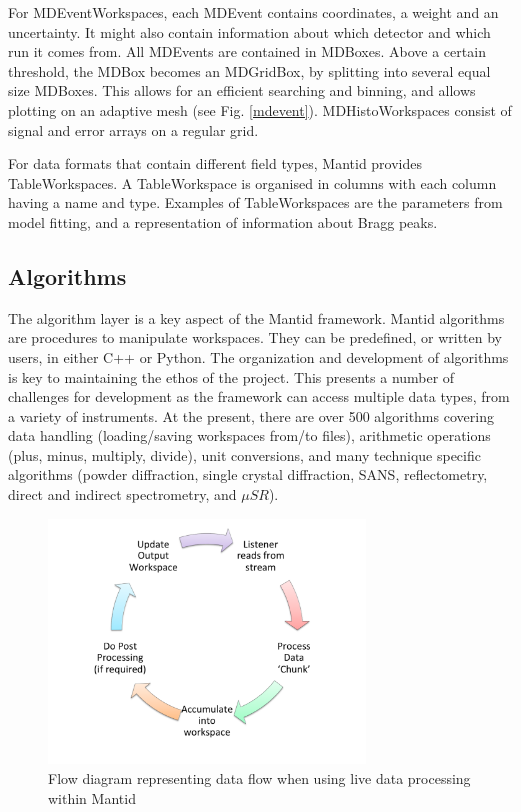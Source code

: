 \documentclass[1p]{elsarticle}
\begin{document}
For MDEventWorkspaces, each MDEvent contains coordinates, a weight and an uncertainty. It might also contain information about which detector and which run it comes from. All MDEvents are contained in MDBoxes. Above a certain threshold, the MDBox becomes an MDGridBox, by splitting into several equal size MDBoxes. This allows for an efficient searching and binning, and allows plotting on an adaptive mesh (see Fig. \ref{mdevent}).
MDHistoWorkspaces consist of signal and error arrays on a regular grid.  


For data formats that contain different field types, Mantid provides TableWorkspaces. A TableWorkspace is organised in columns with each column having a name and type. Examples of TableWorkspaces are the parameters from model fitting, and a representation of information about Bragg peaks.


\subsection{Algorithms}
The algorithm layer is a key aspect of the Mantid framework.
Mantid algorithms are procedures to manipulate workspaces. They can be predefined, or written by users, in either C++ or Python.  The organization and development of algorithms is key to maintaining the ethos of the project. This presents a number of challenges for development as the framework can access multiple data types, from a variety of instruments. At the present, there are over 500 algorithms covering data handling (loading/saving workspaces from/to files), arithmetic operations (plus, minus, multiply, divide), unit conversions, and many technique specific algorithms (powder diffraction, single crystal diffraction, SANS, reflectometry, direct and indirect spectrometry, and $\mu SR$).  
\begin{figure}[!b]
\centerline{\includegraphics[width=0.75\textwidth]{LiveEvents.pdf}}
\caption{Flow diagram representing data flow when using live data processing within Mantid}
\label{live events}
\end{figure}
\end{document}
